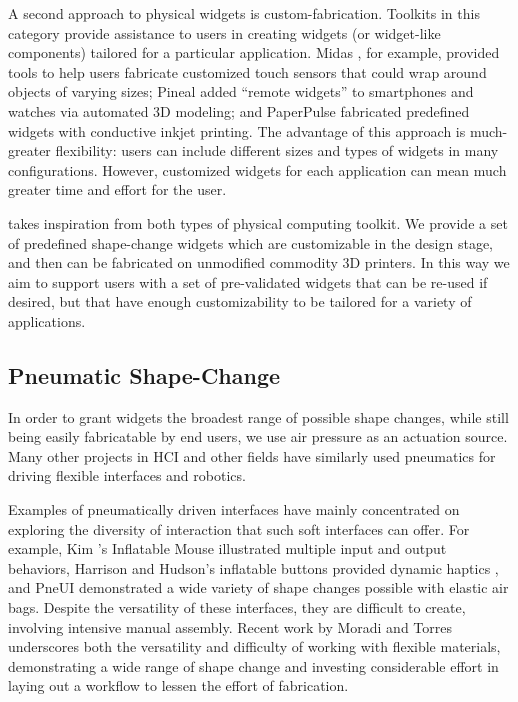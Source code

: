       A second approach to physical widgets is custom-fabrication. Toolkits in
      this category provide assistance to users in creating widgets (or
      widget-like components) tailored for a particular application. Midas
      \cite{Savage:2012}, for example, provided tools to help users fabricate
      customized touch sensors that could wrap around objects of varying sizes;
      Pineal \cite{Ledo:2017} added ``remote widgets'' to smartphones and
      watches via automated 3D modeling; and PaperPulse \cite{Ramakers:2015}
      fabricated predefined widgets with conductive inkjet printing. The
      advantage of this approach is much-greater flexibility: users can include
      different sizes and types of widgets in many configurations. However,
      customized widgets for each application can mean much greater time and
      effort for the user.
      
      \mp takes inspiration from both types of physical computing toolkit. We
      provide a set of predefined shape-change widgets which are customizable in
      the design stage, and then can be fabricated on unmodified commodity 3D
      printers. In this way we aim to support users with a set of pre-validated
      widgets that can be re-used if desired, but that have enough
      customizability to be tailored for a variety of applications.
        
    \subsection{Pneumatic Shape-Change}
      In order to grant \mp widgets the broadest range of possible shape
      changes, while still being easily fabricatable by end users, we use air
      pressure as an actuation source. Many other projects in HCI and other
      fields have similarly used pneumatics for driving flexible interfaces and
      robotics.

      Examples of pneumatically driven interfaces have mainly concentrated on
      exploring the diversity of interaction that such soft interfaces can
      offer. For example, Kim \etal's Inflatable Mouse \cite{Kim:2008}
      illustrated multiple input and output behaviors, Harrison and Hudson's
      inflatable buttons provided dynamic haptics \cite{Harrison:2009}, and
      PneUI \cite{Yao:2013} demonstrated a wide variety of shape changes
      possible with elastic air bags. Despite the versatility of these
      interfaces, they are difficult to create, involving intensive manual
      assembly. Recent work by Moradi and Torres \cite{Moradi:2020} underscores
      both the versatility and difficulty of working with flexible materials,
      demonstrating a wide range of shape change and investing considerable
      effort in laying out a workflow to lessen the effort of fabrication.

